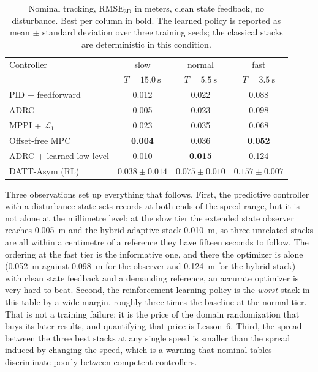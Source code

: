 \begin{table}[t]
\caption{Nominal tracking, $\mathrm{RMSE}_{\mathrm{3D}}$ in meters, clean state
feedback, no disturbance. Best per column in bold. The learned policy is reported as
mean $\pm$ standard deviation over three training seeds; the classical stacks are
deterministic in this condition.}
\label{tab:nominal}
\begin{center}\small
\begin{tabular}{lccc}
\toprule
Controller & slow & normal & fast \\
           & $T=\SI{15.0}{\second}$ & $T=\SI{5.5}{\second}$ & $T=\SI{3.5}{\second}$ \\
\midrule
PID + feedforward        & 0.012 & 0.022 & 0.088 \\
ADRC                     & 0.005 & 0.023 & 0.098 \\
MPPI + $\mathcal{L}_1$   & 0.023 & 0.035 & 0.068 \\
Offset-free MPC          & \textbf{0.004} & 0.036 & \textbf{0.052} \\
ADRC + learned low level & 0.010 & \textbf{0.015} & 0.124 \\
DATT-Asym (RL)           & $0.038\pm0.014$ & $0.075\pm0.010$ & $0.157\pm0.007$ \\
\bottomrule
\end{tabular}
\end{center}
\end{table}

Three observations set up everything that follows. First, the predictive controller with
a disturbance state sets records at both ends of the speed range, but it is not alone at
the millimetre level: at the slow tier the extended state observer reaches
\SI{0.005}{\meter} and the hybrid adaptive stack \SI{0.010}{\meter}, so three unrelated
stacks are all within a centimetre of a reference they have fifteen seconds to follow.
The ordering at the fast tier is the informative one, and there the optimizer is alone
(\SI{0.052}{\meter} against \SI{0.098}{\meter} for the observer and \SI{0.124}{\meter}
for the hybrid stack) --- with clean state feedback and a demanding reference, an
accurate optimizer is very hard to beat. Second, the reinforcement-learning policy is the \emph{worst}
stack in this table by a wide margin, roughly three times the baseline at the normal
tier. That is not a training failure; it is the price of the domain randomization that
buys its later results, and quantifying that price is Lesson~6. Third, the spread
between the three best stacks at any single speed is smaller than the spread induced by
changing the speed, which is a warning that nominal tables discriminate poorly between
competent controllers.

